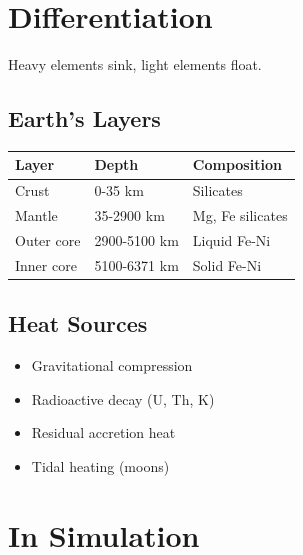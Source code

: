 \documentclass[
  11pt,
  letterpaper,
  twoside,
  openright]{book}
\providecommand{\tightlist}{%
  \setlength{\itemsep}{0pt}\setlength{\parskip}{0pt}}
\begin{document}
\section{Differentiation}\label{differentiation}

Heavy elements sink, light elements float.

\subsection{Earth's Layers}\label{earths-layers}

\begin{longtable}[]{@{}lll@{}}
\toprule\noalign{}
Layer & Depth & Composition \\
\midrule\noalign{}
\endhead
\bottomrule\noalign{}
\endlastfoot
Crust & 0-35 km & Silicates \\
Mantle & 35-2900 km & Mg, Fe silicates \\
Outer core & 2900-5100 km & Liquid Fe-Ni \\
Inner core & 5100-6371 km & Solid Fe-Ni \\
\end{longtable}

\subsection{Heat Sources}\label{heat-sources}

\begin{itemize}
\tightlist
\item
  Gravitational compression
\item
  Radioactive decay (U, Th, K)
\item
  Residual accretion heat
\item
  Tidal heating (moons)
\end{itemize}

\section{In Simulation}\label{in-simulation-7}
\end{document}
